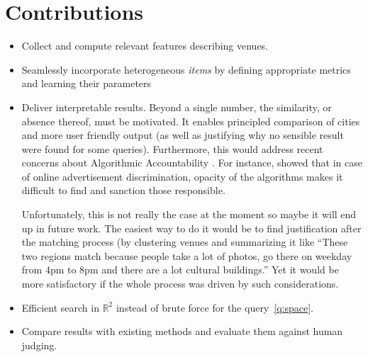 \section{Contributions}

\begin{itemize}
	\item Collect and compute relevant features describing venues.
	\item Seamlessly incorporate heterogeneous \emph{items} by defining
		appropriate metrics and learning their parameters
	\item Deliver interpretable results. Beyond a single number, the
		similarity, or absence thereof, must be motivated. It enables
		principled comparison of cities and more user friendly output
		(as well as justifying why no sensible result were found for
		some queries). Furthermore, this would address recent
		concerns about Algorithmic Accountability
		\autocite{Accountability13}. For instance,
		\textcite{Discrimination13} showed that in case of online
		advertisement discrimination, opacity of the algorithms makes
		it difficult to find and sanction those responsible.
        \begin{comments}
            Unfortunately, this is not really the case at the moment so maybe
            it will end up in future work. The easiest way to do it would be
            to find justification after the matching process (by clustering
            venues and summarizing it like \enquote{These two regions match
            because people take a lot of photos, go there on weekday from
            4pm to 8pm and there are a lot cultural buildings.} Yet it would
            be more satisfactory if the whole process was driven by such
            considerations.
        \end{comments}
	\item Efficient search in $\mathbb{R}^2$ instead of brute force for
		the query~\ref{q:space}.
	\item Compare results with existing methods and evaluate them against
		human judging.
\end{itemize}
